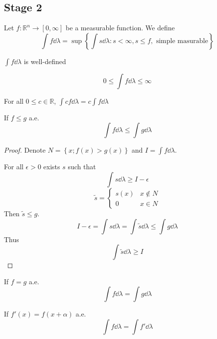\subsection{Stage 2}

Let $f: \mathbb{R}^n \to [0,\infty]$ be a measurable function. We define
$$\int f \dd{\lambda } = \sup \left\{ \int s\dd{\lambda} : s<\infty, s\leq f, \text{ simple masurable} \right\}$$
\begin{prop}
	$\int f\dd{\lambda}$ is well-defined
\end{prop} 
\begin{prop}
	$$0\leq \int f\dd{\lambda} \leq \infty$$
\end{prop} 
\begin{prop}
	For all $0\leq c \in \mathbb{R}$, $\int cf\dd{\lambda} = c\int f\dd{\lambda}$
\end{prop} 
\begin{prop}
	If $f\leq g$ a.e.
	$$\int f \dd{\lambda} \leq \int g \dd{\lambda}$$
	\begin{proof}
		Denote $N = \left\{ x ; f(x) > g(x) \right\}$ and $I = \int f\dd{\lambda}$.
		
		For all $\epsilon>0$  exists $s$ such that
		$$\int s \dd{\lambda} \geq I-\epsilon$$
		$$\tilde{s} = \begin{cases}
		s(x) & x\notin N\\
		0 &  x\in N
		\end{cases}$$
		Then $\tilde{s} \leq g$.
		$$I-\epsilon = \int s \dd{\lambda}  = \int \tilde{s} \dd{\lambda} \leq \int g \dd{\lambda}$$
		Thus
		$$\int \tilde{s} \dd{\lambda} \geq I$$
	\end{proof}
\end{prop} 
\begin{prop}
If $f= g$ a.e.
$$\int f \dd{\lambda} = \int g \dd{\lambda}$$
\end{prop} 
\begin{prop}
If $f'(x)= f(x+\alpha)$ a.e.
$$\int f \dd{\lambda} = \int f' \dd{\lambda}$$
\end{prop} 


